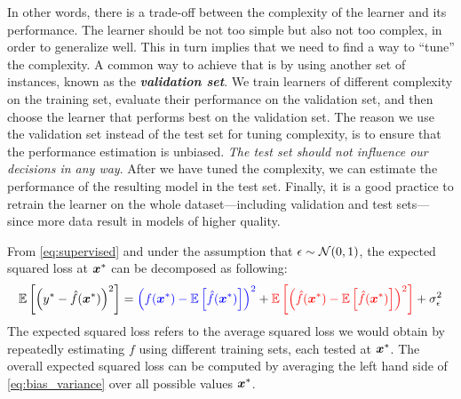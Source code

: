 In other words, there is a trade-off between the complexity of the learner and
its performance. The learner should be not too simple but also not too complex,
in order to generalize well. This in turn implies that we need to find a way to
``tune'' the complexity. A common way to achieve that is by using another set of
instances, known as the \emph{\textbf{validation set}}. We
train learners of different complexity on the training set,
evaluate their performance on the validation set, and then choose the learner
that performs best on the validation set. The reason we use the validation set
instead of the test set for tuning complexity, is to ensure that the performance
estimation is unbiased. \emph{The test set should not influence
our decisions in any way}. After we have tuned the complexity, we can estimate
the performance of the resulting model in the test set. Finally, it is a good
practice to retrain the learner on the whole dataset---including validation and
test sets---since more data result in models of higher quality.

\begin{theorem}
	\label{thrm:bias_variance}
	From \Equation{} \ref{eq:supervised} and under the assumption that $\epsilon
	\sim \mathcal{N}(0, 1)$, the expected squared loss at $\boldsymbol{x}^*$ can be decomposed as
	following:
	\begin{equation}
		\label{eq:bias_variance}
		\mathbb{E}\left[\left(y^* - \hat{f}(\boldsymbol{x}^*)\right)^2\right]
		=
		\color{blue}\left(f(\boldsymbol{x}^*) - \mathbb{E}\left[\hat{f}(\boldsymbol{x}^*)\right]\right)^2
		\color{black}
		+
		\color{red}\mathbb{E}\left[\left(\hat{f}(\boldsymbol{x}^*) - \mathbb{E}\left[\hat{f}(\boldsymbol{x}^*)\right]\right)^2\right]
		\color{black}
		+
		\sigma_{\epsilon}^{2}
	\end{equation}
	The expected squared loss refers to the average squared loss we would obtain
	by repeatedly estimating $f$ using different training sets, each tested at
	$\boldsymbol{x}^*$. The overall expected squared loss can be computed by averaging the
	left hand side of \Equation{} \ref{eq:bias_variance} over all possible values
	$\boldsymbol{x}^*$.
\end{theorem}

